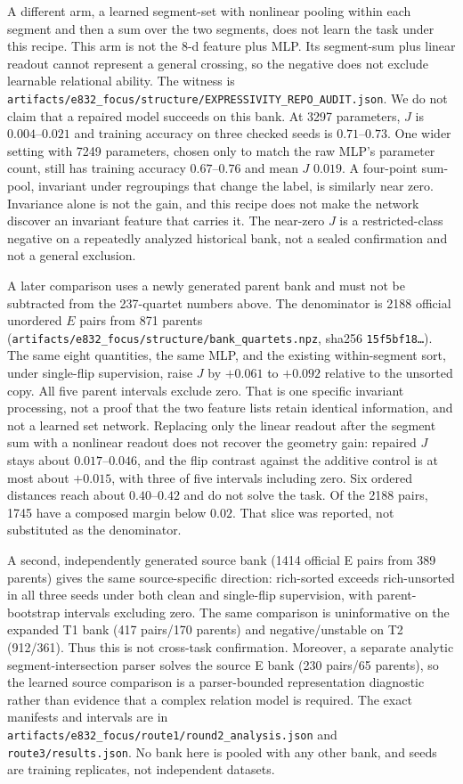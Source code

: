A different arm, a learned segment-set with nonlinear pooling within each segment and then a sum over the two segments, does not learn the task under this recipe. This arm is not the 8-d feature plus MLP. Its segment-sum plus linear readout cannot represent a general crossing, so the negative does not exclude learnable relational ability. The witness is \texttt{artifacts/e832\_focus/structure/EXPRESSIVITY\_REPO\_AUDIT.json}. We do not claim that a repaired model succeeds on this bank. At 3297 parameters, $J$ is $0.004$--$0.021$ and training accuracy on three checked seeds is $0.71$--$0.73$. One wider setting with 7249 parameters, chosen only to match the raw MLP's parameter count, still has training accuracy $0.67$--$0.76$ and mean $J$ $0.019$. A four-point sum-pool, invariant under regroupings that change the label, is similarly near zero. Invariance alone is not the gain, and this recipe does not make the network discover an invariant feature that carries it. The near-zero $J$ is a restricted-class negative on a repeatedly analyzed historical bank, not a sealed confirmation and not a general exclusion.

A later comparison uses a newly generated parent bank and must not be subtracted from the 237-quartet numbers above. The denominator is 2188 official unordered $E$ pairs from 871 parents (\texttt{artifacts/e832\_focus/structure/bank\_quartets.npz}, sha256 \texttt{15f5bf18\ldots}). The same eight quantities, the same MLP, and the existing within-segment sort, under single-flip supervision, raise $J$ by $+0.061$ to $+0.092$ relative to the unsorted copy. All five parent intervals exclude zero. That is one specific invariant processing, not a proof that the two feature lists retain identical information, and not a learned set network. Replacing only the linear readout after the segment sum with a nonlinear readout does not recover the geometry gain: repaired $J$ stays about $0.017$--$0.046$, and the flip contrast against the additive control is at most about $+0.015$, with three of five intervals including zero. Six ordered distances reach about $0.40$--$0.42$ and do not solve the task. Of the 2188 pairs, 1745 have a composed margin below $0.02$. That slice was reported, not substituted as the denominator.

A second, independently generated source bank (1414 official E pairs from 389 parents) gives the same source-specific direction: rich-sorted exceeds rich-unsorted in all three seeds under both clean and single-flip supervision, with parent-bootstrap intervals excluding zero. The same comparison is uninformative on the expanded T1 bank (417 pairs/170 parents) and negative/unstable on T2 (912/361). Thus this is not cross-task confirmation. Moreover, a separate analytic segment-intersection parser solves the source E bank (230 pairs/65 parents), so the learned source comparison is a parser-bounded representation diagnostic rather than evidence that a complex relation model is required. The exact manifests and intervals are in \texttt{artifacts/e832\_focus/route1/round2\_analysis.json} and \texttt{route3/results.json}. No bank here is pooled with any other bank, and seeds are training replicates, not independent datasets.

